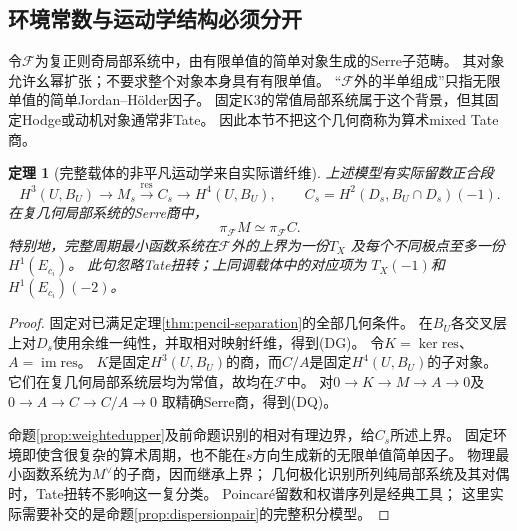 \documentclass[11pt,a4paper]{ctexart}
\theoremstyle{cnplain}\newtheorem{theorem}{定理}[section]
\theoremstyle{definition}\newtheorem{definition}[theorem]{定义}
\theoremstyle{remark}\newtheorem{remark}[theorem]{注}
\begin{document}
\subsection{环境常数与运动学结构必须分开}
令$\mathcal F$为复正则奇局部系统中，由有限单值的简单对象生成的Serre子范畴。
其对象允许幺幂扩张；不要求整个对象本身具有有限单值。
“$\mathcal F$外的半单组成”只指无限单值的简单Jordan--Hölder因子。
固定K3的常值局部系统属于这个背景，但其固定Hodge或动机对象通常非Tate。
因此本节不把这个几何商称为算术mixed Tate商。

\begin{theorem}[完整载体的非平凡运动学来自实际谱纤维]\label{thm:dispersiongysin}
上述模型有实际留数正合段
\[
 H^3(U,B_U)\longrightarrow M_s
 \xrightarrow{\mathrm{res}} C_s
 \longrightarrow H^4(U,B_U),\qquad
 C_s=H^2(D_s,B_U\cap D_s)(-1).
 \tag{DG}\label{eq:dispersiongysin}
\]
在复几何局部系统的Serre商中，
\[
 \pi_{\mathcal F}M\simeq\pi_{\mathcal F}C.
 \tag{DQ}\label{eq:dispersionquotient}
\]
特别地，完整周期最小函数系统在$\mathcal F$外的上界为一份$T_X$
及每个不同极点至多一份$H^1(E_{c_i})$。
此句忽略Tate扭转；上同调载体中的对应项为
$T_X(-1)$和$H^1(E_{c_i})(-2)$。
\end{theorem}
\begin{proof}
固定对已满足定理\ref{thm:pencil-separation}的全部几何条件。
在$B_U$各交叉层上对$D_s$使用余维一纯性，并取相对映射纤维，得到(DG)。
令$K=\ker\mathrm{res}$、$A=\operatorname{im}\mathrm{res}$。
$K$是固定$H^3(U,B_U)$的商，而$C/A$是固定$H^4(U,B_U)$的子对象。
它们在复几何局部系统层均为常值，故均在$\mathcal F$中。
对$0\to K\to M\to A\to0$及$0\to A\to C\to C/A\to0$
取精确Serre商，得到(DQ)。

命题\ref{prop:weightedupper}及前命题识别的相对有理边界，给$C_s$所述上界。
固定环境即使含很复杂的算术周期，也不能在$s$方向生成新的无限单值简单因子。
物理最小函数系统为$M^\vee$的子商，因而继承上界；
几何极化识别所列纯局部系统及其对偶时，Tate扭转不影响这一复分类。
Poincaré留数和权谱序列是经典工具\cite[\S3.1.5、\S3.2]{DeligneWeight}；
这里实际需要补交的是命题\ref{prop:dispersionpair}的完整积分模型。
\end{proof}
\end{document}
